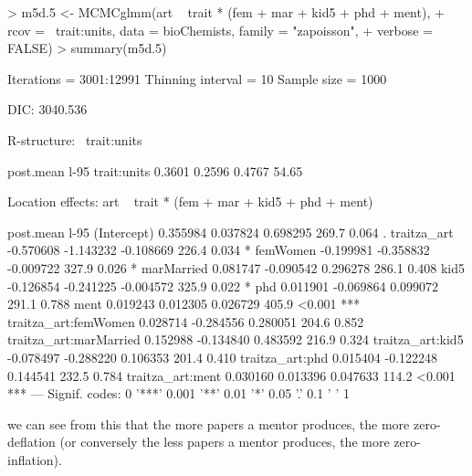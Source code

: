 \documentclass{article}
\begin{document}
\begin{Schunk}
\begin{Sinput}
> m5d.5 <- MCMCglmm(art ~ trait * (fem + mar + kid5 + phd + ment), 
+     rcov = ~trait:units, data = bioChemists, family = "zapoisson", 
+     verbose = FALSE)
> summary(m5d.5)
\end{Sinput}
\begin{Soutput}
 Iterations = 3001:12991
 Thinning interval  = 10
 Sample size  = 1000 

 DIC: 3040.536 

 R-structure:  ~trait:units

            post.mean l-95%
trait:units    0.3601   0.2596   0.4767    54.65

 Location effects: art ~ trait * (fem + mar + kid5 + phd + ment) 

                       post.mean  l-95%
(Intercept)             0.355984  0.037824  0.698295    269.7  0.064 .  
traitza_art            -0.570608 -1.143232 -0.108669    226.4  0.034 *  
femWomen               -0.199981 -0.358832 -0.009722    327.9  0.026 *  
marMarried              0.081747 -0.090542  0.296278    286.1  0.408    
kid5                   -0.126854 -0.241225 -0.004572    325.9  0.022 *  
phd                     0.011901 -0.069864  0.099072    291.1  0.788    
ment                    0.019243  0.012305  0.026729    405.9 <0.001 ***
traitza_art:femWomen    0.028714 -0.284556  0.280051    204.6  0.852    
traitza_art:marMarried  0.152988 -0.134840  0.483592    216.9  0.324    
traitza_art:kid5       -0.078497 -0.288220  0.106353    201.4  0.410    
traitza_art:phd         0.015404 -0.122248  0.144541    232.5  0.784    
traitza_art:ment        0.030160  0.013396  0.047633    114.2 <0.001 ***
---
Signif. codes:  0 '***' 0.001 '**' 0.01 '*' 0.05 '.' 0.1 ' ' 1 
\end{Soutput}
\end{Schunk}

we can see from this that the more papers a mentor produces, the more zero-deflation (or conversely the less papers a mentor produces, the more zero-inflation).

\ifalone
\end{document}
